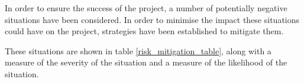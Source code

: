 





In order to ensure the success of the project, a number of potentially negative situations have been considered. In order to minimise the impact these situations could have on the project, strategies have been established to mitigate them.

These situations are shown in table \ref{risk_mitigation_table}, along with a measure of the severity of the situation and a measure of the likelihood of the situation.

